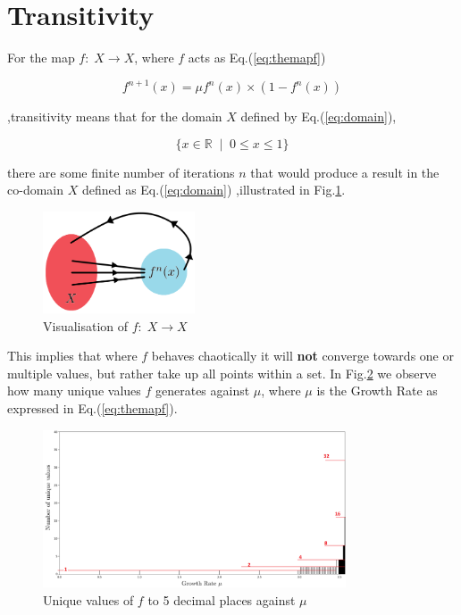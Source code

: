 \section{Transitivity}
For the map $f:\;X \to X$, where $f$ acts as Eq.(\ref{eq:themapf})

\begin{equation}
    \label{eq:themapf}
    f^{n+1}(x)=\mu f^n(x) \times (1-f^n(x))
\end{equation}

,transitivity means that
for the domain $X$ defined by Eq.(\ref{eq:domain}),

\begin{equation}
    \label{eq:domain}
    \{x \in \mathbb{R} \; \mid \;  0 \leq x \leq 1 \}
\end{equation}

there are some finite number of iterations $n$ that would
produce a result in the co-domain $X$ defined as Eq.(\ref{eq:domain})
,illustrated in Fig.\ref{fig:setnime}.

\begin{figure}[h]
    \centering
    \includegraphics[width=0.4\textwidth]{Images/setnime.png}
    \caption{Visualisation of $f:\;X \to X$}
    \label{fig:setnime}
\end{figure}

This implies that where $f$ behaves chaotically it will \textbf{not} converge
towards one or multiple values, but rather take up all points within 
a set. In Fig.\ref{fig:trans1} we observe how many unique values $f$ generates against $\mu$,
where $\mu$ is the Growth Rate as expressed in Eq.(\ref{eq:themapf}).

\begin{figure}[h]
    \centering
    \includegraphics[width=0.8\textwidth]{Images/trans 1.png}
    \caption{Unique values of $f$ to 5 decimal places against $\mu$ }
    \label{fig:trans1}
\end{figure}

